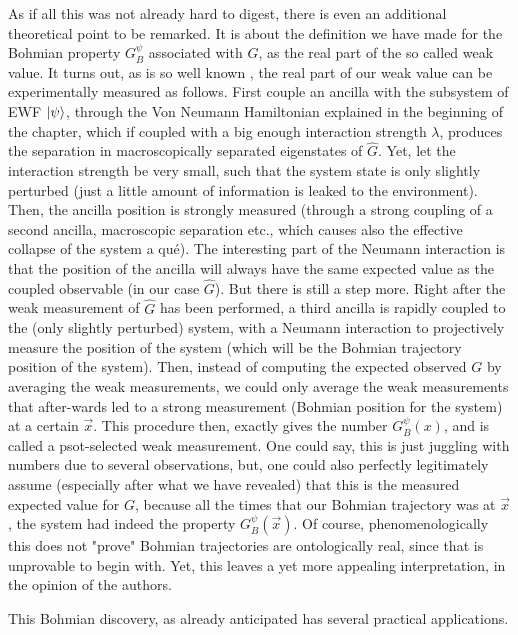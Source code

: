\documentclass[11pt, a4paper]{article} %
\begin{document}
As if all this was not already hard to digest, there is even an additional theoretical point to be remarked. It is about the definition we have made for the Bohmian property $G_B^\psi$ associated with $G$, as the real part of the so called weak value. It turns out, as is so well known \cite{Weak}, the real part of our weak value can be experimentally measured as follows. First couple an ancilla with the subsystem of EWF $\ket{\psi}$, through the Von Neumann Hamiltonian explained in the beginning of the chapter, which if coupled with a big enough interaction strength $\lambda$, produces the separation in macroscopically separated eigenstates of $\hat{G}$. Yet, let the interaction strength be very small, such that the system state is only slightly perturbed (just a little amount of information is leaked to the environment). Then, the ancilla position is strongly measured (through a strong coupling of a second ancilla, macroscopic separation etc., which causes also the effective collapse of the system a qué). The interesting part of the Neumann interaction is that the position of the ancilla will always have the same expected value as the coupled observable (in our case $\hat{G}$). But there is still a step more. Right after the weak measurement of $\hat{G}$ has been performed, a third ancilla is rapidly coupled to the (only slightly perturbed) system, with a Neumann interaction to projectively measure the position of the system (which will be the Bohmian trajectory position of the system). Then, instead of computing the expected observed $G$ by averaging the weak measurements, we could only average the weak measurements that after-wards led to a strong measurement (Bohmian position for the system) at a certain $\vec{x}$. This procedure then, exactly gives the number $G^\psi_B(x)$, and is called a psot-selected weak measurement. One could say, this is just juggling with numbers due to several observations, but, one could also perfectly legitimately assume (especially after what we have revealed) that this is the measured expected value for $G$, because all the times that our Bohmian trajectory was at $\vec{x}$, the system had indeed the property $G^\psi_B(\vec{x})$. Of course, phenomenologically this does not "prove" Bohmian trajectories are ontologically real, since that is unprovable to begin with. Yet, this leaves a yet more appealing interpretation, in the opinion of the authors.

This Bohmian discovery, as already anticipated has several practical applications. 
\end{document}
